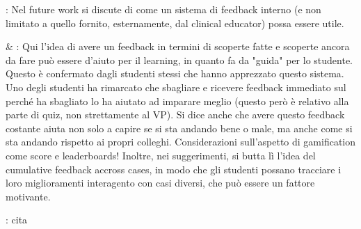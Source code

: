 \cite{banszki2018clinical}: Nel future work si discute di come un sistema di feedback interno (e non limitato a quello fornito, esternamente, dal clinical educator) possa essere utile.



\cite{hirumi2016advancing} & \cite{hirumi2016advancingPart2}: %
Qui l'idea di avere un feedback in termini di scoperte fatte e scoperte ancora da fare può essere d'aiuto per il learning, in quanto fa da "guida" per lo studente. Questo è confermato dagli studenti stessi che hanno apprezzato questo sistema. Uno degli studenti ha rimarcato che sbagliare e ricevere feedback immediato sul perché ha sbagliato lo ha aiutato ad imparare meglio (questo però è relativo alla parte di quiz, non strettamente al VP). 
Si dice anche che avere questo feedback costante aiuta non solo a capire se si sta andando bene o male, ma anche come si sta andando rispetto ai propri colleghi. Considerazioni sull'aspetto di gamification come score e leaderboards! Inoltre, nei suggerimenti, si butta lì l'idea del cumulative feedback accross cases, in modo che gli studenti possano tracciare i loro miglioramenti interagento con casi diversi, che può essere un fattore motivante.

\cite{jacklin2018improving}: cita %

